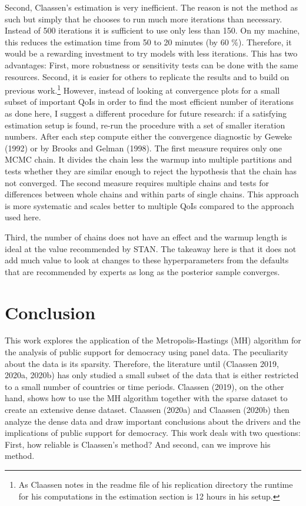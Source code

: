 \documentclass[12pt,english,a4paper,oneside]{article}
\theoremstyle{definition}
\theoremstyle{definition}
\theoremstyle{definition}
\theoremstyle{definition}
\theoremstyle{remark}
\begin{document}
Second, Claassen's estimation is very inefficient. The reason is not the method as such but simply that he chooses to run much more iterations than necessary. Instead of 500 iterations it is sufficient to use only less than 150. On my machine, this reduces the estimation time from 50 to 20 minutes (by 60 \(\%\)). Therefore, it would be a rewarding investment to try models with less iterations. This has two advantages: First, more robustness or sensitivity tests can be done with the same resources. Second, it is easier for others to replicate the results and to build on previous work.\footnote{As Claassen notes in the readme file of his replication directory the runtime for his computations in the estimation section is 12 hours in his setup.} However, instead of looking at convergence plots for a small subset of important QoIs in order to find the most efficient number of iterations as done here, I suggest a different procedure for future research: if a satisfying estimation setup is found, re-run the procedure with a set of smaller iteration numbers. After each step compute either the convergence diagnostic by Geweke (1992) or by Brooks and Gelman (1998). The first measure requires only one MCMC chain. It divides the chain less the warmup into multiple partitions and tests whether they are similar enough to reject the hypothesis that the chain has not converged. The second measure requires multiple chains and tests for differences between whole chains and within parts of single chains. This approach is more systematic and scales better to multiple QoIs compared to the approach used here.

Third, the number of chains does not have an effect and the warmup length is ideal at the value recommended by STAN. The takeaway here is that it does not add much value to look at changes to these hyperparameters from the defaults that are recommended by experts as long as the posterior sample converges.

\hypertarget{conclusion}{%
\section{Conclusion}\label{conclusion}}

This work explores the application of the Metropolis-Hastings (MH) algorithm for the analysis of public support for democracy using panel data. The peculiarity about the data is its sparsity. Therefore, the literature until (Claassen 2019, 2020a, 2020b) has only studied a small subset of the data that is either restricted to a small number of countries or time periods. Claassen (2019), on the other hand, shows how to use the MH algorithm together with the sparse dataset to create an extensive dense dataset. Claassen (2020a) and Claassen (2020b) then analyze the dense data and draw important conclusions about the drivers and the implications of public support for democracy. This work deals with two questions: First, how reliable is Claassen's method? And second, can we improve his method.
\end{document}
